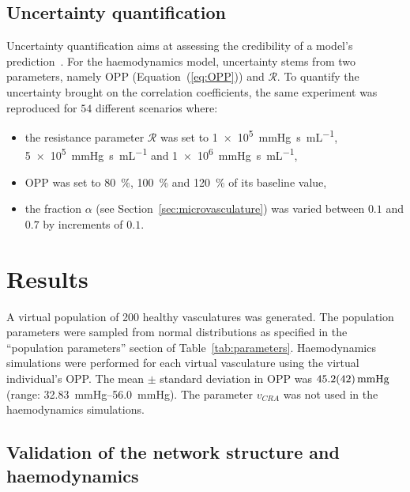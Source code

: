 \documentclass[11pt,]{article}
\begin{document}
\subsection{Uncertainty quantification}\label{sec:methods-UQ}

Uncertainty quantification aims at assessing the credibility of a model's prediction~\cite{ASME2018,Viceconti2021}.
For the haemodynamics model, uncertainty stems from two parameters, namely OPP (Equation~(\ref{eq:OPP})) and $\mathcal R$.
To quantify the uncertainty brought on the correlation coefficients, the same experiment was reproduced for $54$ different scenarios where:
\begin{itemize}
\item the resistance parameter $\mathcal R$ was set to \SI[per-mode=symbol]{1e5}{\mmHg\second\per\mL}, \SI[per-mode=symbol]{5e5}{\mmHg\second\per\mL} and \SI[per-mode=symbol]{1e6}{\mmHg\second\per\mL},
\item OPP was set to \SI{80}{\percent}, \SI{100}{\percent} and \SI{120}{\percent} of its baseline value,
\item the fraction $\alpha$ (see Section~\ref{sec:microvasculature}) was varied between $0.1$ and $0.7$ by increments of $0.1$.
\end{itemize}

\section{Results}\label{sec:results}

A virtual population of 200 healthy vasculatures was generated.
The population parameters were sampled from normal distributions as specified in the ``population parameters'' section of Table~\ref{tab:parameters}. %
Haemodynamics simulations were performed for each virtual vasculature using the virtual individual's OPP.
The mean $\pm$ standard deviation in OPP was $\SI{45.2 \pm 4.2}{\mmHg}$ (range: \SIrange{32.83}{56.0}{\mmHg}).
The parameter $v_{CRA}$ was not used in the haemodynamics simulations.

\subsection{Validation of the network structure and haemodynamics}\label{sec:validation}
\end{document}
